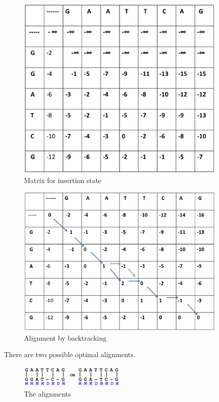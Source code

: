 \documentclass[english, a4paper,11pt]{article}
\begin{document}
\begin{figure}
\begin{centering}
\caption{Matrix for insertion state}
\includegraphics[width=4in]{Slide3}
\par\end{centering}
\end{figure}

\begin{figure}
\begin{centering}
\includegraphics[width=4in]{Slide4}\caption{Alignment by backtracking}
\par\end{centering}
\end{figure}

There are two possible optimal alignments.

\begin{figure}
\begin{centering}
\includegraphics[width=2in]{alignment2}
\par\end{centering}
\caption{The alignments}
\end{figure}
\end{document}
